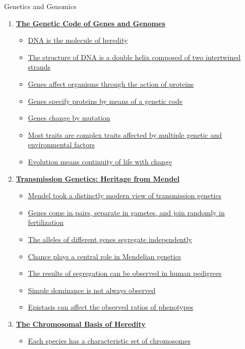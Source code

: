 \documentclass[12pt,letterpaper]{article}
\begin{document}
\begin{chapbox}{Genetics and Genomics}{ 
\begin{enumerate}[font=\bfseries, wide]
\item \hyperlink{1}{\textbf{The Genetic Code of Genes and Genomes}}
    \begin{itemize}
        \item \hyperlink{1.1}{DNA is the molecule of heredity}
        \item \hyperlink{1.2}{The structure of DNA is a double helix composed of two intertwined strands}
        \item \hyperlink{1.3}{Genes affect organisms through the action of proteins}
        \item \hyperlink{1.4}{Genes specify proteins by means of a genetic code}
        \item \hyperlink{1.5}{Genes change by mutation}
        \item \hyperlink{1.6}{Most traits are complex traits affected by multiple genetic and environmental factors}
        \item \hyperlink{1.7}{Evolution means continuity of life with change}
    \end{itemize}
    \item \hyperlink{2}{\textbf{Transmission Genetics: Heritage from Mendel}}
    \begin{itemize}
        \item \hyperlink{2.1}{Mendel took a distinctly modern view of transmission genetics}
        \item \hyperlink{2.2}{Genes come in pairs, separate in gametes, and join randomly in fertilization}
        \item \hyperlink{2.3}{The alleles of different genes segregate independently}
        \item \hyperlink{2.4}{Chance plays a central role in Mendelian genetics}
        \item \hyperlink{2.5}{The results of segregation can be observed in human pedigrees}
        \item \hyperlink{2.6}{Simple dominance is not always observed}
        \item \hyperlink{2.7}{Epistasis can affect the observed ratios of phenotypes}
    \end{itemize}
    \item \hyperlink{3}{\textbf{The Chromosomal Basis of Heredity}}
    \begin{itemize}
        \item \hyperlink{3.1}{Each species has a characteristic set of chromosomes}

\end{itemize}
\end{enumerate}}
\end{chapbox}
\end{document}
